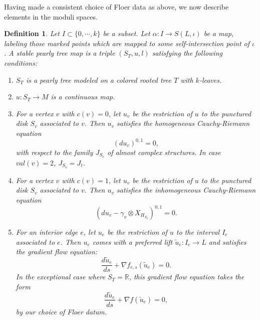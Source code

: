 \documentclass{amsart}
\newtheorem{definition}[theorem]{Definition}
\numberwithin{equation}{section}
\numberwithin{figure}{section}
\begin{document}
	Having made a consistent choice of Floer data as above, we now describe elements in the moduli spaces. \par

\begin{definition}\label{stable pearly tree map}
	Let $I \subset \{0, \cdots, k\}$ be a subset. Let $\alpha: I \to S(L, \iota)$ be a map, labeling those marked points which are mapped to some self-intersection point of $\iota$. A stable pearly tree map is a triple $(S_{T}, u, l)$ satisfying the following conditions:

\begin{enumerate}[label = (\roman*)]

\item $S_{T}$ is a pearly tree modeled on a colored rooted tree $T$ with $k$-leaves.

\item $u: S_{T} \to M$ is a continuous map.

\item For a vertex $v$ with $c(v) = 0$, let $u_{v}$ be the restriction of $u$ to the punctured disk $S_{v}$ associated to $v$. Then $u_{v}$ satisfies the homogeneous Cauchy-Riemann equation
\begin{equation} \label{homogeneous Cauchy-Riemann equation on the disk components}
(du_{v})^{0, 1} = 0,
\end{equation}
with respect to the family $J_{S_{v}}$ of almost complex structures. In case $val(v) = 2$, $J_{S_{v}} = J_{t}$.

\item For a vertex $v$ with $c(v) = 1$, let $u_{v}$ be the restriction of $u$ to the punctured disk $S_{v}$ associated to $v$. Then $u_{v}$ satisfies the inhomogeneous Cauchy-Riemann equation
\begin{equation} \label{inhomogeneous Cauchy-Riemann equation on disk components}
(du_{v} - \gamma_{v} \otimes X_{H_{S_{v}}})^{0, 1} = 0.
\end{equation}

\item For an interior edge $e$, let $u_{e}$ be the restriction of $u$ to the interval $I_{e}$ associated to $e$. Then $u_{e}$ comes with a preferred lift $\tilde{u}_{e}: I_{e} \to L$ and satisfies the gradient flow equation:
\begin{equation} \label{gradient flow equation on interval components}
\frac{d\tilde{u}_{e}}{ds} + \nabla f_{e, s}(\tilde{u}_{e}) = 0.
\end{equation}
In the exceptional case where $S_{T} = \mathbb{R}$, this gradient flow equation takes the form
\begin{equation}
\frac{d\tilde{u}_{e}}{ds}+ \nabla f(\tilde{u}_{e}) = 0,
\end{equation}
by our choice of Floer datum.


\end{enumerate}
\end{definition}
\end{document}
